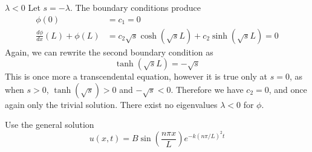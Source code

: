 \documentclass[a4paper]{article}
\begin{document}
\begin{enumerate}[label=(\alph*)]
	\underline{\( \lambda < 0 \)}
	Let \( s = -\lambda \). The boundary conditions produce
	\begin{align*}
		\phi \!\left( 0 \right) & = c_{1} = 0 \\
		\frac{d \phi}{d x}\!\left( L \right) + \phi \!\left( L \right) & = c_{2}\sqrt{s}\cosh\!\left(\sqrt{s}L\right) + c_{2}\sinh\!\left(\sqrt{s}L\right) = 0
	\end{align*}
	Again, we can rewrite the second boundary condition as 
	\[
		\tanh\!\left( \sqrt{s}L \right) = -\sqrt{s} 
	\]
	This is once more a transcendental equation, however it is true only at \( s = 0 \), as when \( s > 0 \), \( \tanh\!\left( \sqrt{s} \right) > 0 \) and \( -\sqrt{s} < 0 \). Therefore we have \( c_{2} = 0 \), and once again only the trivial solution. There exist no eigenvalues \( \lambda < 0 \) for \( \phi \).
\end{enumerate}

\newpage

Use the general solution
\[
	u \!\left( x,t \right) = B \sin\!\left(\frac{n \pi x}{L}\right)e^{-k \!\left( n \pi / L \right)^{2}t} 
\]
\end{document}
